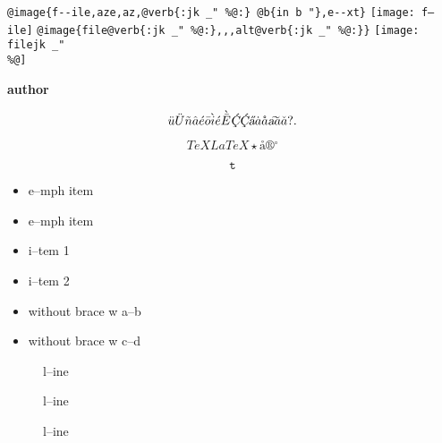 \documentclass{book}
\renewcommand{\includegraphics}[1]{\fbox{FIG \detokenize{#1}}}
\begin{document}
\texttt{@image\{f{-}{-}ile,aze,az,@verb\{:jk \_" \%@:\} @b\{in b "\},e{-}{-}xt\}} \texttt{[image: f--ile]}
\texttt{@image\{file@verb\{:jk \_" \%@:\},,,alt@verb\{:jk \_" \%@:\}\}} \texttt{[image: filejk \_" \\\%@]}


{\bfseries author}%

$$
\ddot{u} \ddot{U} \tilde{n} \hat{a} \acute{e} \bar{o} \grave{i} \acute{e} \grave{\bar{E}}
\textsl{\c{\'{C}}} \textsl{\c{\'{C}}} \textsl{\H{a}} \dot{a} \mathring{a} \textsl{\t{a}}
\breve{a} \check{a}
 ? .
$$

$$
TeX LaTeX \star{} \mathord{\text{\aa{}}} \circledR{} ^{\circ{}} 
$$

$$
\mathtt{t} 
$$

\begin{itemize}[label=\emph{}]
\item e--mph item
\end{itemize}

\begin{itemize}[label=\emph{} after emph]
\item e--mph item
\end{itemize}

\begin{itemize}[label=\textbullet{} a--n itemize line]
\item i--tem 1
\item i--tem 2
\end{itemize}

\begin{itemize}[label={}]
\item without brace w a--b
\item without brace w c--d
\end{itemize}

\begin{description}
\item[{\parbox[b]{\linewidth}{%
a}}]
l--ine
\end{description}

\begin{description}
\item[{\parbox[b]{\linewidth}{%
a--missing style formatting}}]
l--ine
\end{description}

\begin{description}
\item[{\parbox[b]{\linewidth}{%
a\\
\index[fn]{a@\texttt{a}}%
\index[cp]{index entry between item and itemx}%
b
\index[fn]{b@\texttt{b}}%
}}]
l--ine
\end{description}
\end{document}

